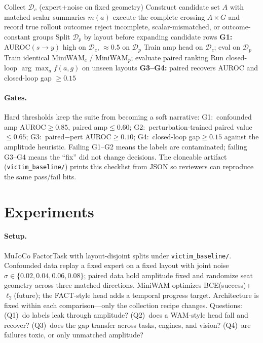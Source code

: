 \documentclass[conference]{IEEEtran}
\begin{document}
\begin{algorithm}[t]
\caption{AGCD (summary)}
\label{alg:agcd}
\begin{algorithmic}[1]
\State Collect $\mathcal{D}_c$ (expert+noise on fixed geometry)
\State Construct candidate set $A$ with matched scalar summaries $m(a)$
  \State execute the complete crossing $A\times G$ and record true rollout outcomes
  \State reject incomplete, scalar-mismatched, or outcome-constant groups
\EndFor
\State Split $\mathcal{D}_p$ by layout before expanding candidate rows
\State \textbf{G1:} AUROC$(s\!\rightarrow\!y)$ high on $\mathcal{D}_c$, $\approx 0.5$ on $\mathcal{D}_p$
\State Train amp head on $\mathcal{D}_c$; eval on $\mathcal{D}_p$ 
\State Train identical MiniWAM$_c$ / MiniWAM$_p$; evaluate paired ranking
\State Run closed-loop $\arg\max_a f(a,g)$ on unseen layouts
\State \textbf{G3--G4:} paired recovers AUROC and closed-loop gap $\ge 0.15$
\end{algorithmic}
\end{algorithm}

\paragraph{Gates.}
Hard thresholds keep the suite from becoming a soft narrative:
G1:~confounded amp AUROC$\ge 0.85$, paired amp$\le 0.60$;
G2:~perturbation-trained paired value$\le 0.65$;
G3:~paired$-$pert AUROC$\ge 0.10$;
G4:~closed-loop gap$\ge 0.15$ against the amplitude heuristic.
Failing G1--G2 means the labels are contaminated; failing G3--G4 means the
``fix'' did not change decisions. The cloneable artifact
(\texttt{victim\_baseline/}) prints this checklist from JSON so reviewers can
reproduce the same pass/fail bits.

\section{Experiments}
\label{sec:exp}

\paragraph{Setup.}
MuJoCo FactorTask with layout-disjoint splits under
\texttt{victim\_baseline/}. Confounded data replay a fixed expert on a fixed
layout with joint noise $\sigma\in\{0.02,0.04,0.06,0.08\}$; paired data hold
amplitude fixed and randomize seat geometry across three matched directions.
MiniWAM optimizes BCE(success)+$\ell_2$(future); the FACT-style head adds a
temporal progress target. Architecture is fixed within each comparison---only
the collection recipe changes. Questions: (Q1)~do labels leak through amplitude?
(Q2)~does a WAM-style head fall and recover? (Q3)~does the gap transfer across
tasks, engines, and vision? (Q4)~are failures toxic, or only unmatched
amplitude?
\end{document}
